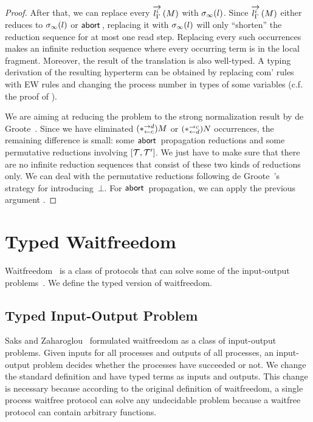 {\begin{proof}
 After that, we can replace
 every ${\ltor i l\Gamma M}$ with
 $\lstore_\infty(l)$.
 Since $\ltor i l\Gamma M$ either reduces to $\lstore_\infty(l)$ or $\abort$,
 replacing it with $\lstore_\infty(l)$ will only ``shorten'' the reduction
 sequence for at most one read step.
 Replacing every such occurrences
 makes an infinite reduction sequence where every occurring term is
 in the local fragment.
 Moreover,
 the result of the translation is also well-typed.
 A typing derivation of the resulting hyperterm can be obtained by
 replacing com' rules with EW rules and changing the process number in
 types of some variables (c.f. the proof of ).

We are aiming at reducing the problem to the strong normalization result
by de Groote~\cite{Philippe2002js}.
Since we have eliminated $(\comodL)M$ or $(\comodR)N$ occurrences,
the remaining difference is small: some $\abort$ propagation reductions
 and some permutative reductions involving $\cotuple{\term,\term'}$.
We just have to make sure that there are no infinite reduction sequences
that consist of these two kinds of reductions only.
We can deal with the permutative reductions following de
 Groote~\cite{Philippe2002js}'s strategy for introducing~$\bot$.
For $\abort$ propagation, we can apply the previous argument .
\end{proof}

\section{Typed Waitfreedom}
\label{waitfreedom}

Waitfreedom~\cite{Herlihy88,Saks:1993vq} is a class of protocols
that can solve
some of the input-output problems~\cite{Moran:1987ep,Biran:1988hh}.
We define the typed version of waitfreedom.

\subsection{Typed Input-Output Problem}

Saks and Zaharoglou~\cite{Saks:1993vq} formulated waitfreedom as a class
of input-output
problems.
Given inputs for all processes and outputs of all
processes, an input-output problem decides whether the processes have
succeeded or not.
We change the standard definition and have typed terms as inputs and
outputs.
This change is necessary because according to the original definition of
waitfreedom,
a single process waitfree protocol can solve any undecidable problem
because a waitfree protocol can contain arbitrary functions.

}
